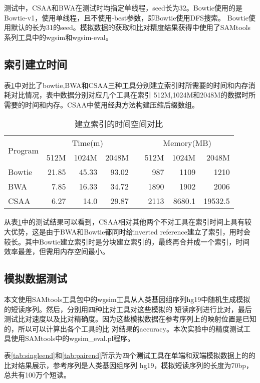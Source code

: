 测试中，CSAA和BWA在测试时均指定单线程，seed长为32。Bowtie使用的是Bowtie-v1，使用单线程，且不使用-best参数，即Bowtie使用DFS搜索。
Bowtie使用默认的长为31的seed。模拟数据的获取和比对精度结果获得中使用了SAMtools系列工具中的wgsim和wgsim-eval。

\subsection{索引建立时间}
表\ref{tab:tab1}中对比了bowtie,BWA和CSAA三种工具分别建立索引时所需要的时间和内存消耗对比情况，表中数据分别对应几个工具在索引
512M,1024M和2048M的数据时所需要的时间和内存。CSAA中使用经典方法构建压缩后缀数组。

\begin{table}[htbp]
    \caption{建立索引的时间空间对比}
    \label{tab:tab1}
    \centering
    \begin{tabular}{lrrrp{2ex}rrr}
        \hline
        \multirow{2}{*}{Program} & \multicolumn{3}{c}{Time(m)}& & \multicolumn{3}{c}{Memory(MB)}\\
        \cline{2-4}
        \cline{6-8}
        & 512M &1024M &2048M& &512M &1024M &2048M\\
        \hline
        Bowtie&21.85 &45.33 &93.02& &987 &1109 &1210 \\
        BWA&7.85 &16.33 &34.72& &1890 &1902 &2006 \\
        CSAA&6.27 &14.0 &29.87& &2113 &8680.1 &19532.5 \\
        \hline
    \end{tabular}
\end{table}

从表\ref{tab:tab1}中的测试结果可以看到，CSAA相对其他两个不对工具在索引时间上具有较大优势，这是由于BWA和Bowtie都同时给inverted
reference建立了索引，用时会较长。其中Bowtie建立索引时是分块建立索引的，最终再合并成一个索引，时间效率最差，但需用内存空间最小。

\subsection{模拟数据测试}
本文使用SAMtools工具包中的wgsim工具从人类基因组序列hg19中随机生成模拟的短读序列。然后，分别用四种比对工具对这些模拟的
短读序列进行比对，最后测试比对速度以及比对精确度。因为这些模拟数据在参考序列上的映射位置是已知的，所以可以计算出各个工具的比
对结果的accuracy。本次实验中的精度测试工具使用SAMtools中的wgsim\_eval.pl程序。

表\ref{tab:singleend}和\ref{tab:pairend}所示为四个测试工具在单端和双端模拟数据上的的比对结果展示，参考序列是人类基因组序列
hg19，模拟短读序列的长度为70bp，总共有100万个短读。

